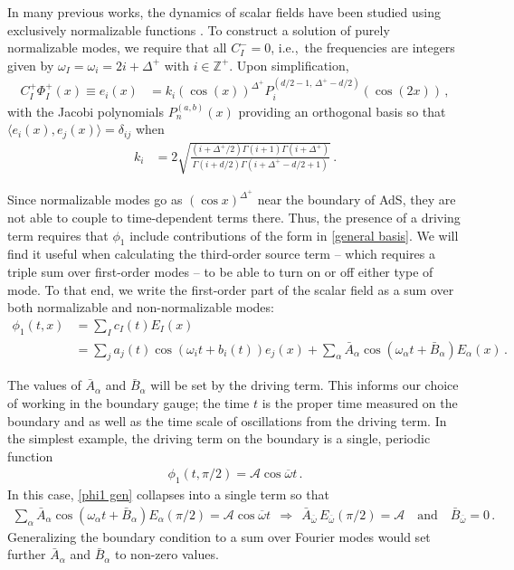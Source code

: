 \documentclass[letterpaper,11pt]{article}
\newcommand{\oi}{\omega_i}
\newcommand{\mc}{\mathcal}
\newcommand{\ob}{\overline{\omega}}
\begin{document}
In many previous works, the dynamics of scalar fields have been studied using exclusively normalizable functions \cite{1508.05474, 1407.6273, 1412.3249, 1508.04943}. To construct a solution of purely normalizable modes, we require that all $C^-_I = 0$, i.e.,~the frequencies are integers given by $\omega_I = \omega_i = 2i + \Delta^+$ with $i \in \mathbb{Z}^+$. Upon simplification, 
\begin{align}
\label{normal basis}
C^+_I \Phi^+_I (x) \equiv e_i(x) &= k_i \left( \cos(x) \right)^{\Delta^+} P_{i}^{(d/2 - 1, \, \Delta^+ - d/2)} \left( \cos (2x) \right) \, ,
\end{align}
with the Jacobi polynomials $P^{(a,b)}_n (x)$ providing an orthogonal basis so that ${\langle e_i (x), e_j(x) \rangle = \delta_{i j}}$ when
\begin{align}
k_i &= 2 \sqrt{\frac{(i + \Delta^+ /2) \Gamma(i+1) \Gamma(i+\Delta^+)}{\Gamma(i+d/2) \Gamma(i + \Delta^+ - d/2 + 1)}} \, .
\end{align} 

Since normalizable modes go as $(\cos x )^{\Delta^+}\!\!$ near the boundary of AdS, they are not able to couple to time-dependent terms there. Thus, the presence of a driving term requires that $\phi_1$ include contributions of the form in \eqref{general basis}. We will find it useful when calculating the third-order source term -- which requires a triple  sum over first-order modes -- to be able to turn on or off either type of mode. To that end, we write the first-order part of the scalar field as a sum over both normalizable and non-normalizable modes:
\begin{align}
\label{phi1 gen}
\phi_1(t,x) &= \sum_I c_I (t)  E_I (x) \nonumber \\
&= \sum_j a_j (t) \cos \left( \oi t + b_i(t) \right) e_j(x) + \sum_\alpha \bar A_\alpha \cos \left( \omega_\alpha t + \bar{B}_\alpha \right) E_\alpha(x) \, .
\end{align}

The values of $\bar A_\alpha$ and $\bar{B}_\alpha$ will be set by the driving term. This informs our choice of working in the boundary gauge; the time $t$ is the proper time measured on the boundary and as well as the time scale of oscillations from the driving term. In the simplest example, the driving term on the boundary is a single, periodic function
\begin{align}
\label{BC}
\phi_1(t,\pi/2) = \mc A \cos \ob t \, .
\end{align}
In this case, \eqref{phi1 gen} collapses into a single term so that
\begin{align}
\sum_\alpha \bar A_\alpha \cos (\omega_\alpha t + \bar B_\alpha )  E_{\alpha} (\pi / 2) = \mc A \cos \ob t \:\: \Rightarrow \:\: \bar A_{\ob} \, E_{\ob} (\pi / 2) = \mc A \quad \text{and} \quad \bar B_{\ob} = 0 \, .
\end{align}
Generalizing the boundary condition to a sum over Fourier modes would set further $\bar A_\alpha$ and $\bar B_\alpha$ to non-zero values. 
\end{document}
